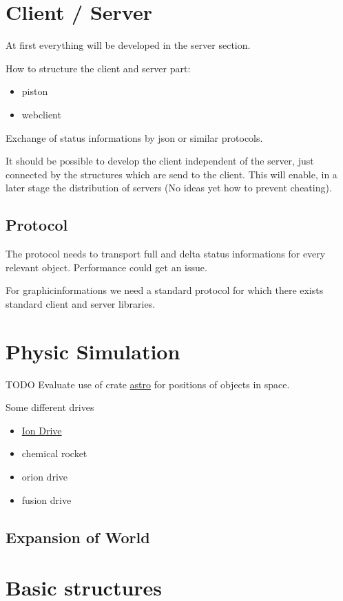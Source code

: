 \section{Client / Server}
At first everything will be developed in the server section.

How to structure the client and server part:
\begin{itemize}
 \item piston
 \item webclient
\end{itemize}
Exchange of status informations by json or similar protocols.

It should be possible to develop the client independent of the server, just connected
by the structures which are send to the client. This will enable, in a later stage
the distribution of servers (No ideas yet how to prevent cheating).

\subsection{Protocol}

The protocol needs to transport full and delta status informations for every relevant object.
Performance could get an issue.

For graphicinformations we need a standard protocol for which there exists standard client
and server libraries.

\section{Physic Simulation}

TODO Evaluate use of crate \href{https://github.com/saurvs/astro-rust}{astro} for positions of objects in space.

Some different drives
\begin{itemize}
 \item \href{https://en.wikipedia.org/wiki/Ion_thruster}{Ion Drive}
 \item chemical rocket
 \item orion drive
 \item fusion drive
\end{itemize}

\subsection{Expansion of World}

\section{Basic structures}


